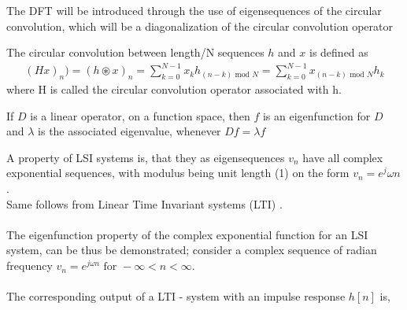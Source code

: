 The DFT will be introduced through the use of eigensequences of the circular convolution, which will be a diagonalization of the circular convolution operator

\begin{definition}
 	The circular convolution between length/N sequences $h$ and $x$ is defined as
\begin{align*}
	(Hx)_n) = (h \circledast x)_n = \sum_{k = 0}^{N-1} x_k h_{(n-k) \text{ mod $N$}} =\sum_{k = 0}^{N-1} x_{(n-k) \text{ mod $N$}} h_k
\end{align*}
where H is called the circular convolution operator associated with h.
\end{definition} \cite{FSP}

\begin{definition}[Eigenfunction]
	If $D$ is a linear operator, on a function space, then $f$ is an eigenfunction for $D$ and $\lambda$ is the associated eigenvalue, whenever $Df = \lambda f$
\end{definition}
\cite{Eigenfunctions}

A property of LSI systems is, that they as eigensequences $v_n$ have all complex exponential sequences, with modulus being unit length (1) on the form $v_n = e^j \omega n$ \cite{FSP}.\\ Same follows from Linear Time Invariant systems (LTI) \cite{DTSP}.
\\\\
The eigenfunction property of the complex exponential function for an LSI system, can be thus be demonstrated; consider a complex sequence of radian frequency $v_n = e^{j\omega n} \text{ for } -\infty < n < \infty$.
\\\\
The corresponding output of a LTI - system with an impulse response $h[n]$ is,

